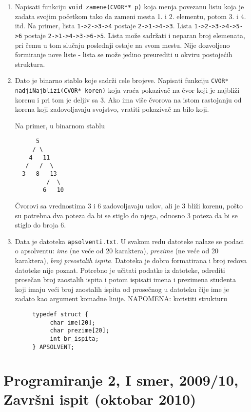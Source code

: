 \begin{enumerate}
\item Napisati funkciju \verb|void zamene(CVOR** p)| koja menja povezanu listu koja
je zadata svojim po\v cetkom tako da zameni mesta 1. i 2. elementu, potom 3. i 4.
itd. Na primer, lista \verb|1->2->3->4| postaje \verb|2->1->4->3|. Lista \verb|1->2->3->4->5->6|
postaje \verb|2->1->4->3->6->5|. Lista mo\v ze sadr\v zati i neparan broj elemenata, pri
\v cemu u tom slu\v caju poslednji ostaje na svom mestu. Nije dozvoljeno formiranje
nove liste - lista se mo\v ze jedino preurediti u okviru postoje\' cih struktura.

\item Dato je binarno stablo koje sadr\v zi cele brojeve. Napisati funkciju
\verb|CVOR* nadjiNajblizi(CVOR* koren)| koja vra\' ca pokaziva\v c na \v cvor koji je najbli\v zi
korenu i pri tom je deljiv sa 3. Ako ima vi\v se \v cvorova na istom rastojanju od
korena koji zadovoljavaju svojstvo, vratiti pokaziva\v c na bilo koji.

Na primer, u binarnom stablu
\begin{verbatim}
      5
     / \
    4   11
   /   /  \
  3   8   13
         /  \
        6   10
\end{verbatim}

\v Cvorovi sa vrednostima 3 i 6 zadovoljavaju uslov, ali je 3 bli\v zi korenu, po\v sto
su potrebna dva poteza da bi se stiglo do njega, odnosno 3 poteza da bi se
stiglo do broja 6.

\item Data je datoteka \verb|apsolventi.txt|. U svakom redu datoteke nalaze se podaci o apsolventu:
  \emph{ime} (ne ve\' ce od 20 karaktera), \emph{prezime} (ne ve\' ce od 20 karaktera),
  \emph{broj preostalih ispita}. Datoteka je dobro formatirana i broj redova datoteke
   nije poznat. Potrebno je u\v citati podatke iz datoteke, odrediti prose\v can broj zaostalih ispita
   i potom ispisati imena i prezimena studenta koji imaju ve\' ci broj zaostalih ispita od prose\v cnog u datoteku
   \v cije ime je zadato kao argument komadne linije. NAPOMENA: koristiti strukturu
\begin{verbatim}
     typedef struct {
          char ime[20];
          char prezime[20];
          int br_ispita;
     } APSOLVENT;
\end{verbatim}
\end{enumerate}


\section{Programiranje 2, I smer, 2009/10, Zavr\v sni ispit (oktobar 2010)}


